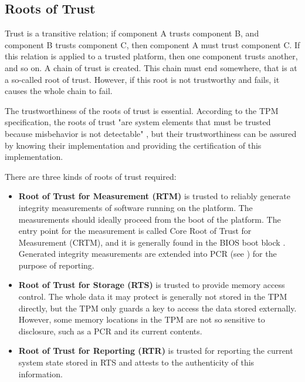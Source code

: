 \subsection{Roots of Trust}
Trust is a transitive relation; if component A trusts component B, and component B trusts component C, then component A must trust component C. If this relation is applied to a trusted platform, then one component trusts another, and so on. A chain of trust is created. This chain must end somewhere, that is at a so-called root of trust. However, if this root is not trustworthy and fails, it causes the whole chain to fail.

The trustworthiness of the roots of trust is essential. According to the TPM specification, the roots of trust "are system elements that must be trusted because misbehavior is not detectable" \cite[p.~23]{tcg_p1_architecture}, but their trustworthiness can be assured by knowing their implementation and providing the certification of this implementation.

There are three kinds of roots of trust required:
\begin{itemize}
    \item \textbf{Root of Trust for Measurement (RTM)} is trusted to reliably generate integrity measurements of software running on the platform. The measurements should ideally proceed from the boot of the platform. The entry point for the measurement is called Core Root of Trust for Measurement (CRTM), and it is generally found in the BIOS boot block \cite[p.~185]{Tomlinson2017}. Generated integrity measurements are extended into PCR (see ) for the purpose of reporting.
    \item \textbf{Root of Trust for Storage (RTS)} is trusted to provide memory access control. The whole data it may protect is generally not stored in the TPM directly, but the TPM only guards a key to access the data stored externally. However, some memory locations in the TPM are not so sensitive to disclosure, such as a PCR and its current contents. 
    \item \textbf{Root of Trust for Reporting (RTR)} is trusted for reporting the current system state stored in RTS and attests to the authenticity of this information.
\end{itemize}

